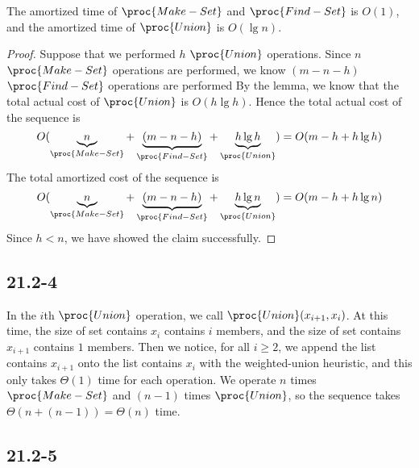 \begin{claim}
    The amortized time of $\proc{Make-Set}$ and $\proc{Find-Set}$ is $O(1)$,
    and the amortized time of $\proc{Union}$ is $O(\lg n)$.
\end{claim}

\begin{proof}
    Suppose that we performed $h$ $\proc{Union}$ operations.
    Since $n$ $\proc{Make-Set}$ operations are performed,
    we know $(m - n - h)$ $\proc{Find-Set}$ operations are performed
    By the lemma, we know that the total actual cost of $\proc{Union}$ is $O(h \lg h)$.
    Hence the total actual cost of the sequence is 
    \begin{equation*}
        O(\underbrace{n}_{\proc{Make-Set}} + \underbrace{(m - n - h)}_{\proc{Find-Set}} + 
        \underbrace{h \lg h}_{\proc{Union}}) = O(m - h + h \lg h)
    \end{equation*}
    The total amortized cost of the sequence is
    \begin{equation*}
        O(\underbrace{n}_{\proc{Make-Set}} + \underbrace{(m - n - h)}_{\proc{Find-Set}} + 
        \underbrace{h \lg n}_{\proc{Union}}) = O(m - h + h \lg n)
    \end{equation*}
    Since $h < n$, we have showed the claim successfully.
\end{proof}

\subsection*{21.2-4}

In the $i$th $\proc{Union}$ operation,
we call $\proc{Union}(x_{i+1},x_i)$.
At this time, 
the size of set contains $x_i$ contains $i$ members,
and the size of set contains $x_{i+1}$ contains $1$ members.
Then we notice, for all $i \geq 2$,
we append the list contains $x_{i+1}$
onto the list contains $x_i$
with the weighted-union heuristic,
and this only takes $\Theta(1)$ time for each operation.
We operate $n$ times $\proc{Make-Set}$
and $(n - 1)$ times $\proc{Union}$,
so the sequence takes $\Theta(n + (n - 1)) = \Theta(n)$ time.

\subsection*{21.2-5}

